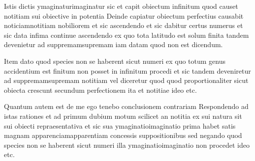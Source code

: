 \documentclass[twoside, openright]{report}
\begin{document}
        \pstart
        Istis dictis ymaginaturimaginatur sic et capit obiectum infinitum quod causet notitiam sui obiective in potentia Deinde capiatur obiectum perfectius causabit noticiamnotitiam nobiliorem et sic ascendendo et sic dabitur certus numerus et sic data infima continue ascendendo ex quo tota latitudo est solum finita tandem devenietur ad suppremamsupremam iam datam quod non est dicendum.
        \pend
     
        \pstart
        Item dato quod species non se haberent sicut numeri ex quo totum genus accidentium est finitum non posset in infinitum procedi et sic tandem deveniretur ad suppremamsupremam notitiam vel diceretur quod quod proportionaliter sicut obiecta crescunt secundum perfectionem ita et notitiae ideo etc.
        \pend
     
        \pstart
        Quantum autem est de me ego tenebo conclusionem contrariam Respondendo ad istas rationes et ad primum dubium motum scilicet an notitia ex sui natura sit sui obiecti repraesentativa et sic sua ymaginatioimaginatio prima habet satis magnam apparenciamapparentiam concessis suppositionibus sed negando quod species non se haberent sicut numeri illa ymaginatioimaginatio non procedet ideo etc.
        \pend
        
        \endnumbering
        
     
        
\end{document}
